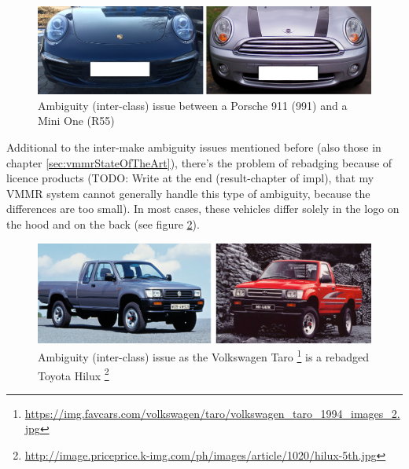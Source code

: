 \begin{figure}[btph]
  \centering
        \includegraphics[width=.75\linewidth]{gfx/ambiguity_porsche_911_mini}
        \caption{Ambiguity (inter-class) issue between a Porsche 911 (991) and a Mini One (R55)}
        \label{fig:ambiguityPorsche}
\end{figure}
Additional to the inter-make ambiguity issues mentioned before (also those in chapter \ref{sec:vmmrStateOfTheArt}), there's the problem of rebadging because of licence products (TODO: Write at the end (result-chapter of impl), that my VMMR system cannot generally handle this type of ambiguity, because the differences are too small). In most cases, these vehicles differ solely in the logo on the hood and on the back (see figure \ref{fig:ambiguityRebadging}).

\begin{figure}[btph]
  \centering
        \includegraphics[width=.75\linewidth]{gfx/ambiguity_rebadging}
        \caption{Ambiguity (inter-class) issue as the Volkswagen Taro \footnote{\url{https://img.favcars.com/volkswagen/taro/volkswagen_taro_1994_images_2.jpg}} is a rebadged Toyota Hilux \footnote{\url{http://image.priceprice.k-img.com/ph/images/article/1020/hilux-5th.jpg}}}
        \label{fig:ambiguityRebadging}
\end{figure}

